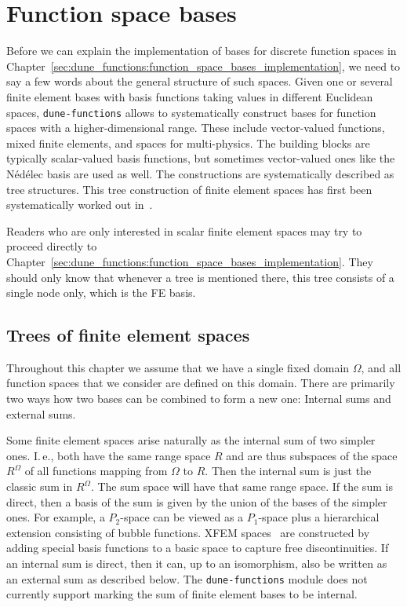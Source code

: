 \documentclass[a4paper,10pt,headings=normal,bibliography=totoc]{scrartcl}
\newcommand{\dunemodule}[1]{\texttt{#1}}
\begin{document}
\setcounter{tocdepth}{2}  %
\tableofcontents



\section{Function space bases}
\label{sec:dune_functions:finite_element_trees}


Before we can explain the implementation of bases for discrete function spaces in Chapter~\ref{sec:dune_functions:function_space_bases_implementation},
we need to say a few words about the general structure of such spaces.  Given one or several finite element bases
with basis functions taking values in different Euclidean spaces,
\dunemodule{dune-functions} allows to systematically construct bases for function spaces with a
higher-dimensional range.  These include vector-valued functions, mixed finite elements, and spaces
for multi-physics.  The building blocks are typically scalar-valued basis functions, but sometimes vector-valued
ones like the N\'ed\'elec basis are used as well. The constructions are systematically described as tree structures.
This tree construction of finite element spaces has first been systematically worked out in~\cite{muething:2015}.

Readers who are only interested in scalar finite element spaces may try to proceed directly to
Chapter~\ref{sec:dune_functions:function_space_bases_implementation}.  They should only know that whenever a tree
is mentioned there, this tree consists of a single node only, which is the FE basis.

\subsection{Trees of finite element spaces}

Throughout this chapter we assume that we have a single fixed domain $\Omega$, and all function spaces
that we consider are defined on this domain.
There are primarily two ways how two bases can be combined to form a new one:
Internal sums and external sums.

Some finite element spaces arise naturally as the internal sum of two simpler ones.
I.\,e., both have the same range space $R$ and are thus subspaces of the space $R^\Omega$
of all functions mapping from $\Omega$ to $R$. Then the internal sum is just the classic
sum in $R^\Omega$.  The sum space will have that same range space.
If the sum is direct, then a basis of the sum is given by the union of the bases of
the simpler ones.
For example,
a $P_2$-space can be viewed as a $P_1$-space plus a hierarchical extension consisting of bubble functions.
XFEM spaces~\cite{moes_dolbow_belytschko:1999} are constructed by adding special basis functions to a basic space to capture
free discontinuities.
If an internal sum is direct, then it can, up to an isomorphism, also be written as
an external sum as described below.
The \dunemodule{dune-functions} module does not currently support marking the sum
of finite element bases to be internal.
\end{document}
